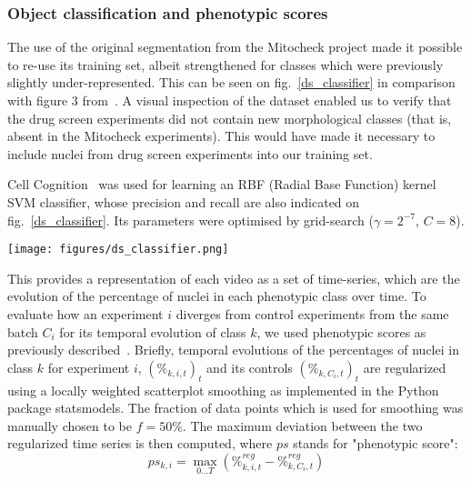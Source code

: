 \subsubsection{Object classification and phenotypic scores}
\label{sec:ps}
The use of the original segmentation from the Mitocheck project made
it possible to re-use its training set, albeit strengthened for
classes which were previously slightly under-represented. This can be
seen on fig.~\ref{ds_classifier} in comparison with figure 3
from~\cite{Walter2010}. A visual inspection of the dataset enabled us
to verify that the drug screen experiments did not contain new morphological classes (that is, absent in the Mitocheck experiments). This would have made it necessary to include nuclei from drug screen experiments into our training set. 

Cell Cognition~\cite{cellcognition} was used for learning an RBF (Radial Base Function) kernel SVM classifier, whose precision and recall are also indicated on fig.~\ref{ds_classifier}. Its parameters were optimised by grid-search ($\gamma=2^{-7}$, $C=8$).

\begin{figure*}[ht!]
\centerline{\texttt{[image: figures/ds\_classifier.png]}}
\caption{Precision and recall per class as provided by Cell Cognition. Compared with the original classifier as published in~\cite{Walter2010}, classes \textit{ADCCM} (Asymmetric Distribution of Condensed Chromosome Masses) and \textit{Out of focus} were added. More nuclei were furthermore included for training in most classes. \textit{Shape1} (resp. \textit{Shape3}, \textit{MetaphaseAlignement}) corresponds to binucleated (resp. polylobed, metaphase alignement problem) nuclei.}
\label{ds_classifier}
\end{figure*}

This provides a representation of each video as a set of time-series, which are the evolution of the percentage of nuclei in each phenotypic class over time. To evaluate how an experiment $i$ diverges from  control experiments from the same batch $C_i$ for its temporal evolution of class $k$, we used phenotypic scores as previously described~\cite{Walter2010}. Briefly, temporal evolutions of the percentages of nuclei in class $k$ for experiment $i$, $(\%_{k,i,t})_t$ and its controls $(\%_{k,C_i,t})_t$ are regularized using a locally weighted scatterplot smoothing as implemented in the Python package statsmodels. The fraction of data points which is used for smoothing was manually chosen to be $f=50\%$. The maximum deviation between the two regularized time series is then computed, where $ps$ stands for "phenotypic score":
\[
ps_{k,i} = \max_{0\ldots T} (\%^{reg}_{k,i,t} - \%^{reg}_{k,C_i,t})
\]

